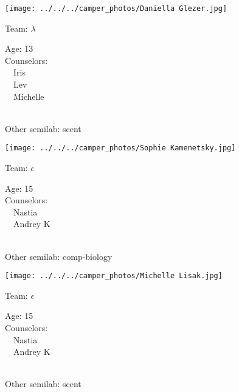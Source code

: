 \documentclass[10pt,letterpaper, landscape]{article}
\begin{document}
\verticalshiftfornextsticker
\renewcommand{\baselinestretch}{1} \begin{sticker}
\noindent\begin{minipage}{0.5\textwidth}\texttt{[image: ../../../camper\_photos/Daniella Glezer.jpg]}\end{minipage}\begin{minipage}{0.45\textwidth}
Team: {\Large $\lambda$}

Age:        13\\
Counselors: \\\ \ Iris\\\ \ Lev\\\ \ Michelle\\
\end{minipage} \\ \vspace{0.07in}
Other semilab: scent
\end{sticker}
\horizontalshiftfornextsticker
\renewcommand{\baselinestretch}{1} \begin{sticker}
\noindent\begin{minipage}{0.5\textwidth}\texttt{[image: ../../../camper\_photos/Sophie Kamenetsky.jpg]}\end{minipage}\begin{minipage}{0.45\textwidth}
Team: {\Large $\epsilon$}

Age:        15\\
Counselors: \\\ \ Nastia\\\ \ Andrey K\\
\end{minipage} \\ \vspace{0.07in}
Other semilab: comp-biology
\end{sticker}
\horizontalshiftfornextsticker
\renewcommand{\baselinestretch}{1} \begin{sticker}
\noindent\begin{minipage}{0.5\textwidth}\texttt{[image: ../../../camper\_photos/Michelle Lisak.jpg]}\end{minipage}\begin{minipage}{0.45\textwidth}
Team: {\Large $\epsilon$}

Age:        15\\
Counselors: \\\ \ Nastia\\\ \ Andrey K\\
\end{minipage} \\ \vspace{0.07in}
Other semilab: scent
\end{sticker}
\end{document}
